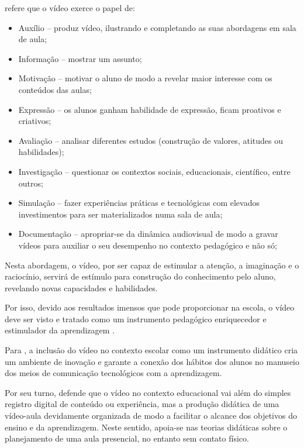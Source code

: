 \documentclass[portuguese]{textolivre}
\begin{document}
 refere que o vídeo exerce o papel de:

\begin{itemize}
    \item Auxílio -- produz vídeo, ilustrando e completando as suas abordagens em sala de aula;
    \item Informação -- mostrar um assunto;
    \item Motivação -- motivar o aluno de modo a revelar maior interesse com os conteúdos das aulas;
    \item Expressão -- os alunos ganham habilidade de expressão, ficam proativos e criativos;
    \item Avaliação -- analisar diferentes estudos (construção de valores, atitudes ou habilidades);
    \item Investigação -- questionar os contextos sociais, educacionais, científico, entre outros;
    \item Simulação -- fazer experiências práticas e tecnológicas com elevados investimentos para ser materializados numa sala de aula;
    \item Documentação -- apropriar-se da dinâmica audiovisual de modo a gravar vídeos para auxiliar o seu desempenho no contexto pedagógico e não só;
\end{itemize}

Nesta abordagem, o vídeo, por ser capaz de estimular a atenção, a imaginação e o raciocínio, servirá de estímulo para construção do conhecimento pelo aluno, revelando novas capacidades e habilidades.

Por isso, devido aos resultados imensos que pode proporcionar na escola, o vídeo deve ser visto e tratado como um instrumento pedagógico enriquecedor e estimulador da aprendizagem \cite{deckert2010}. 

Para \textcite{silveira2020}, a inclusão do vídeo no contexto escolar como um instrumento didático cria um ambiente de inovação e garante a conexão dos hábitos dos alunos no manuseio dos meios de comunicação tecnológicos com a aprendizagem.

Por seu turno, \textcite{deckert2010} defende que o vídeo no contexto educacional vai além do simples registro digital de conteúdo ou experiência, mas a produção didática de uma vídeo-aula devidamente organizada de modo a facilitar o alcance dos objetivos do ensino e da aprendizagem. Neste sentido, apoia-se nas teorias didáticas sobre o planejamento de uma aula presencial, no entanto sem contato físico.
\end{document}
